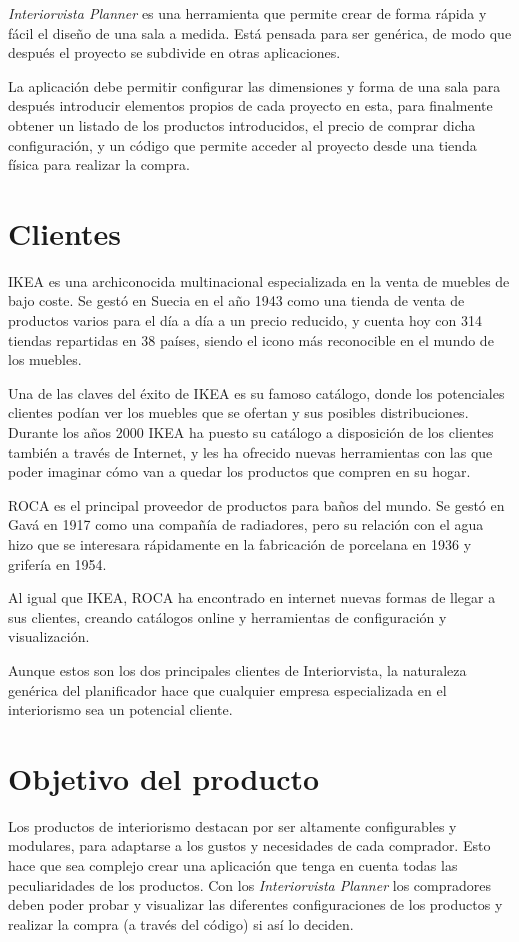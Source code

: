 \textit{Interiorvista Planner} es una herramienta que permite crear de forma rápida y fácil el diseño de una sala a medida. Está pensada para ser genérica, de modo que después el proyecto se subdivide en otras aplicaciones.

La aplicación debe permitir configurar las dimensiones y forma de una sala para después introducir elementos propios de cada proyecto en esta, para finalmente obtener un listado de los productos introducidos, el precio de comprar dicha configuración, y un código que permite acceder al proyecto desde una tienda física para realizar la compra.

\section{Clientes}
IKEA\cite{ikea_history} es una archiconocida multinacional especializada en la venta de muebles de bajo coste. Se gestó en Suecia en el año 1943 como una tienda de venta de productos varios para el día a día a un precio reducido, y cuenta hoy con 314 tiendas repartidas en 38 países, siendo el icono más reconocible en el mundo de los muebles.

Una de las claves del éxito de IKEA es su famoso catálogo, donde los potenciales clientes podían ver los muebles que se ofertan y sus posibles distribuciones. Durante los años 2000 IKEA ha puesto su catálogo a disposición de los clientes también a través de Internet, y les ha ofrecido nuevas herramientas con las que poder imaginar cómo van a quedar los productos que compren en su hogar.

ROCA\cite{roca_history} es el principal proveedor de productos para baños del mundo. Se gestó en Gavá en 1917 como una compañía de radiadores, pero su relación con el agua hizo que se interesara rápidamente en la fabricación de porcelana en 1936 y grifería en 1954.

Al igual que IKEA, ROCA ha encontrado en internet nuevas formas de llegar a sus clientes, creando catálogos online y herramientas de configuración y visualización.

Aunque estos son los dos principales clientes de Interiorvista, la naturaleza genérica del planificador hace que cualquier empresa especializada en el interiorismo sea un potencial cliente.

\section{Objetivo del producto}
Los productos de interiorismo destacan por ser altamente configurables y modulares, para adaptarse a los gustos y necesidades de cada comprador. Esto hace que sea complejo crear una aplicación que tenga en cuenta todas las peculiaridades de los productos. Con los \textit{Interiorvista Planner} los compradores deben poder probar y visualizar las diferentes configuraciones de los productos y realizar la compra (a través del código) si así lo deciden.

